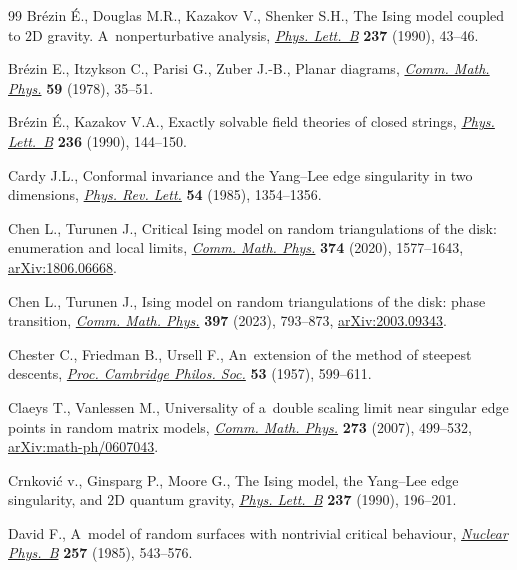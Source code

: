 \begin{thebibliography}{99}
Br\'ezin {\'E}., Douglas M.R., Kazakov V., Shenker S.H., The {I}sing model
 coupled to {$2$}{D} gravity. {A}~nonperturbative analysis,
 \href{https://doi.org/10.1016/0370-2693(90)90458-I}{\textit{Phys. Lett.~B}}
 \textbf{237} (1990), 43--46.

Br\'ezin E., Itzykson C., Parisi G., Zuber J.-B., Planar diagrams,
 \href{https://doi.org/10.1007/BF01614153}{\textit{Comm. Math. Phys.}}
 \textbf{59} (1978), 35--51.

Br\'ezin {\'E}., Kazakov V.A., Exactly solvable field theories of closed
 strings, \href{https://doi.org/10.1016/0370-2693(90)90818-Q}{\textit{Phys.
 Lett.~B}} \textbf{236} (1990), 144--150.

Cardy J.L., Conformal invariance and the {Y}ang--{L}ee edge singularity in two
 dimensions, \href{https://doi.org/10.1103/PhysRevLett.54.1354}{\textit{Phys.
 Rev. Lett.}} \textbf{54} (1985), 1354--1356.

Chen L., Turunen J., Critical {I}sing model on random triangulations of the
 disk: enumeration and local limits,
 \href{https://doi.org/10.1007/s00220-019-03672-5}{\textit{Comm. Math. Phys.}}
 \textbf{374} (2020), 1577--1643,
 \href{http://arxiv.org/abs/1806.06668}{arXiv:1806.06668}.

Chen L., Turunen J., Ising model on random triangulations of the disk: phase
 transition, \href{https://doi.org/10.1007/s00220-022-04508-5}{\textit{Comm.
 Math. Phys.}} \textbf{397} (2023), 793--873,
 \href{http://arxiv.org/abs/2003.09343}{arXiv:2003.09343}.

Chester C., Friedman B., Ursell F., An~extension of the method of steepest
 descents, \href{https://doi.org/10.1017/s0305004100032655}{\textit{Proc.
 Cambridge Philos. Soc.}} \textbf{53} (1957), 599--611.

Claeys T., Vanlessen M., Universality of a~double scaling limit near singular
 edge points in random matrix models,
 \href{https://doi.org/10.1007/s00220-007-0256-9}{\textit{Comm. Math. Phys.}}
 \textbf{273} (2007), 499--532,
 \href{http://arxiv.org/abs/math-ph/0607043}{arXiv:math-ph/0607043}.

Crnkovi\'c v., Ginsparg P., Moore G., The {I}sing model, the {Y}ang--{L}ee edge
 singularity, and {$2$}{D} quantum gravity,
 \href{https://doi.org/10.1016/0370-2693(90)91428-E}{\textit{Phys. Lett.~B}}
 \textbf{237} (1990), 196--201.

David F., A~model of random surfaces with nontrivial critical behaviour,
 \href{https://doi.org/10.1016/0550-3213(85)90363-3}{\textit{Nuclear Phys.~B}}
 \textbf{257} (1985), 543--576.


\end{thebibliography}
